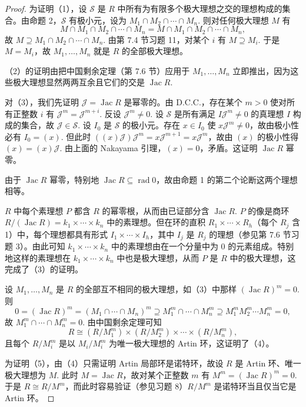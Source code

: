 \begin{proof}
为证明（1），设 \(\mathcal{S}\) 是 \(R\) 中所有为有限多个极大理想之交的理想构成的集合。由命题 2，\(\mathcal{S}\) 有极小元，设为 \(M_1 \cap M_2 \cap \cdots \cap M_n\). 则对任何极大理想 \(M\) 有
\[
M \cap M_1 \cap M_2 \cap \cdots \cap M_n = M \cap M_1 \cap M_2 \cap \cdots \cap M_n,
\]
故 \(M \supseteq M_1 \cap M_2 \cap \cdots \cap M_n\). 由第 7.4 节习题 11，对某个 \(i\) 有 \(M \supseteq M_i\). 于是 \(M = M_i\)，故 \(M_1, \ldots, M_n\) 就是 \(R\) 的全部极大理想。

（2）的证明由把中国剩余定理（第 7.6 节）应用于 \(M_1, \ldots, M_n\) 立即推出，因为这些极大理想显然两两互余且它们的交是 \(\operatorname{Jac}R\).

对（3），我们先证明 \(\mathcal{J} = \operatorname{Jac}R\) 是幂零的。由 D.C.C.，存在某个 \(m > 0\) 使对所有正整数 \(i\) 有 \(\mathcal{J}^m = \mathcal{J}^{m+i}\). 反设 \(\mathcal{J}^m \neq 0\). 设 \(\mathcal{S}\) 是所有满足 \(I\mathcal{J}^m \neq 0\) 的真理想 \(I\) 构成的集合，故 \(\mathcal{J} \in \mathcal{S}\). 设 \(I_0\) 是 \(\mathcal{S}\) 的极小元。存在 \(x \in I_0\) 使 \(x\mathcal{J}^m \neq 0\)，故由极小性必有 \(I_0 = (x)\). 但此时 \(((x)\mathcal{J})\mathcal{J}^m = x\mathcal{J}^{m+1} = x\mathcal{J}^m\)，故由 \((x)\) 的极小性得 \((x) = (x)\mathcal{J}\). 由上面的 Nakayama 引理，\((x) = 0\)，矛盾。这证明 \(\operatorname{Jac}R\) 幂零。

由于 \(\operatorname{Jac}R\) 幂零，特别地 \(\operatorname{Jac}R \subseteq \operatorname{rad}0\)，故由命题 1 的第二个论断这两个理想相等。

\(R\) 中每个素理想 \(P\) 都含 \(R\) 的幂零根，从而由已证部分含 \(\operatorname{Jac}R\). \(P\) 的像是商环 \(R/(\operatorname{Jac}R) = k_1 \times \cdots \times k_n\) 中的素理想。但在环的直积 \(R_1 \times \cdots \times R_h\)（每个 \(R_j\) 含 1）中，每个理想都具有形式 \(I_1 \times \cdots \times I_h\)，其中 \(I_j\) 是 \(R_j\) 的理想（参见第 7.6 节习题 3）。由此可知 \(k_1 \times \cdots \times k_n\) 中的素理想由在一个分量中为 0 的元素组成。特别地这样的素理想在 \(k_1 \times \cdots \times k_n\) 中也是极大理想，从而 \(P\) 是 \(R\) 中的极大理想，这完成了（3）的证明。

设 \(M_1, \ldots, M_n\) 是 \(R\) 的全部互不相同的极大理想，如（3）中那样 \((\operatorname{Jac}R)^m = 0\). 则
\[
0 = (\operatorname{Jac}R)^m = (M_1 \cap \cdots \cap M_n)^m \supseteq M_1^m \cap \cdots \cap M_n^m \supseteq M_1^mM_2^m\cdots M_n^m = 0,
\]
故 \(M_1^m \cap \cdots \cap M_n^m = 0\). 由中国剩余定理可知
\[
R \cong (R/M_1^m) \times (R/M_2^m) \times \cdots \times (R/M_n^m),
\]
且每个 \(R/M_i^m\) 是以 \(M_i/M_i^m\) 为唯一极大理想的 Artin 环，这证明了（4）。

为证明（5），由（4）只需证明 Artin 局部环是诺特环，故设 \(R\) 是 Artin 环、唯一极大理想为 \(M\). 此时 \(M = \operatorname{Jac}R\)，故对某个正整数 \(m\) 有 \(M^m = (\operatorname{Jac}R)^m = 0\). 于是 \(R \cong R/M^m\)，而此时容易验证（参见习题 8）\(R/M^m\) 是诺特环当且仅当它是 Artin 环。
\end{proof}

